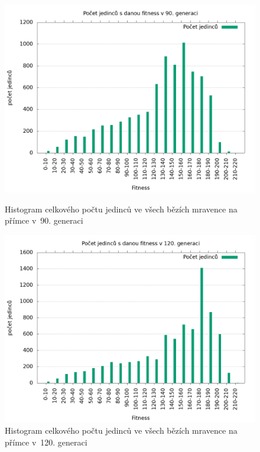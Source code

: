 \begin{figure}[h]
    \begin{minipage}[c]{0.48\linewidth}
        \includegraphics[width=\linewidth]{obrazky/mravenec_primka_fitnessHistogram90.png}
        \caption{Histogram celkového počtu jedinců ve všech bězích mravence na přímce v~90. generaci}
        \label{fig:mravenec_primka_histogram_90}
    \end{minipage}
    \hfill
    \begin{minipage}[c]{0.48\linewidth}
        \includegraphics[width=\linewidth]{obrazky/mravenec_primka_fitnessHistogram120.png}
        \caption{Histogram celkového počtu jedinců ve všech bězích mravence na přímce v~120. generaci}
        \label{fig:mravenec_primka_histogram_120}
    \end{minipage}
\end{figure}

